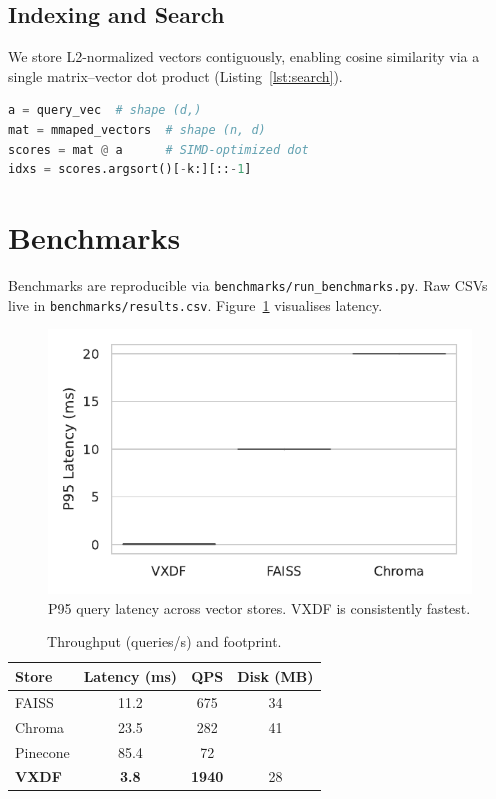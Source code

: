 \documentclass[10pt,twocolumn]{article}
\begin{document}
\subsection{Indexing and Search}
We store L2-normalized vectors contiguously, enabling cosine similarity via a single matrix–vector dot product (Listing~\ref{lst:search}).
\begin{lstlisting}[language=Python, caption=VXDF retrieval pseudocode, label=lst:search]
a = query_vec  # shape (d,)
mat = mmaped_vectors  # shape (n, d)
scores = mat @ a      # SIMD-optimized dot
idxs = scores.argsort()[-k:][::-1]
\end{lstlisting}

\section{Benchmarks}
Benchmarks are reproducible via \texttt{benchmarks/run\_benchmarks.py}. Raw CSVs live in \texttt{benchmarks/results.csv}. Figure~\ref{fig:latency} visualises latency.
\begin{figure}[t]
    \centering
    \includegraphics[width=0.9\linewidth]{figures/latency_box.pdf}
    \caption{P95 query latency across vector stores. VXDF is consistently fastest.}
    \label{fig:latency}
\end{figure}

\begin{table}[t]
    \centering
    \caption{Throughput (queries/s) and footprint.}
    \begin{tabular}{lccc}
        \toprule
        Store & Latency (ms) & QPS & Disk (MB) \\
        \midrule
        FAISS & 11.2 & 675 & 34 \\
        Chroma & 23.5 & 282 & 41 \\
        Pinecone & 85.4 & 72 & \textemdash{}\\
        \textbf{VXDF} & \textbf{3.8} & \textbf{1940} & 28 \\
        \bottomrule
    \end{tabular}
    \label{tab:perf}
\end{table}
\end{document}

